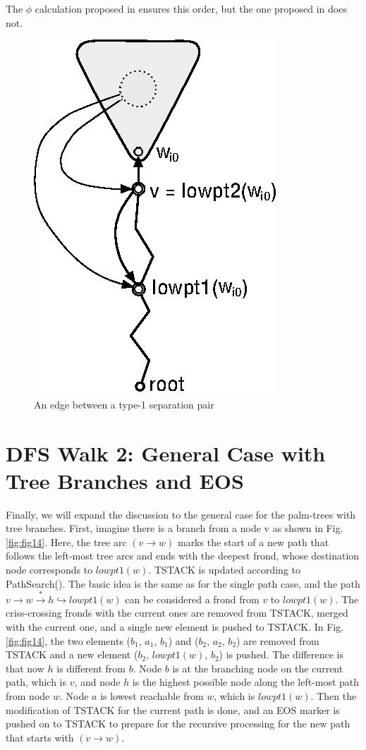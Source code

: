 \documentclass[twoside,twocolumn]{article}
\begin{document}
The $\phi$ calculation proposed in \cite{GM01} ensures this order, but the one
proposed in \cite{HT73} does not.

\begin{figure}[!htb]
\centering
\includegraphics[scale=1.0]{spqr_fig13.eps}
\caption{An edge between a type-1 separation pair}
\label{fig:fig13}
\end{figure}

\section{DFS Walk 2: General Case with Tree Branches and EOS}
Finally, we will expand the discussion to the general case for the palm-trees
with tree branches.
First, imagine there is a branch from a node v as shown in Fig. \ref{fig:fig14}.
Here, the tree arc $(v \rightarrow w)$ marks the start of a new path that follows
 the left-most tree arcs and ends with the deepest frond, whose destination
 node corresponds to $lowpt1(w)$. {\ttfamily TSTACK} is updated according to {\ttfamily PathSearch()}.
 The basic idea is the same as for the single path case, and the path
 $v \rightarrow w \xrightarrow* h \hookrightarrow lowpt1(w)$ can be considered a frond from $v$ to $lowpt1(w)$.
 The criss-crossing fronds with the current ones are
 removed from {\ttfamily TSTACK}, merged with the current one, and a single new element is
pushed to {\ttfamily TSTACK}. In Fig. \ref{fig:fig14}, the two elements ($b_1$, $a_1$, $b_1$) and ($b_2$, $a_2$, $b_2$) 
are removed from {\ttfamily TSTACK}
and a new element ($b_2$, $lowpt1(w)$, $b_2$) is pushed.
 The difference is that now $h$ is different from $b$.
Node $b$ is at the branching node on the current path, which is $v$,
and node $h$ is the highest possible node along the left-most path from node $w$.
Node $a$ is lowest reachable from $w$, which is $lowpt1(w)$.
Then the modification of {\ttfamily TSTACK} for the current path is done, and an {\ttfamily EOS} marker is pushed on to {\ttfamily TSTACK}
to prepare for the recursive processing for the new path that starts with $(v \rightarrow w)$.
\end{document}
